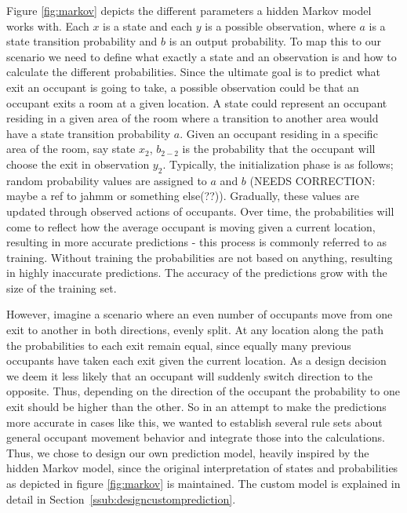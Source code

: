 Figure \ref{fig:markov} depicts the different parameters a hidden Markov model works with. Each \(x\) is a state and each \(y\) is a possible observation, where \(a\) is a state transition probability and \(b\) is an output probability. To map this to our scenario we need to define what exactly a state and an observation is and how to calculate the different probabilities. Since the ultimate goal is to predict what exit an occupant is going to take, a possible observation could be that an occupant exits a room at a given location. A state could represent an occupant residing in a given area of the room where a transition to another area would have a state transition probability \(a\). Given an occupant residing in a specific area of the room, say state \(x_2\), \(b_{2-2}\) is the probability that the occupant will choose the exit in observation \(y_2\). Typically, the initialization phase is as follows; random probability values are assigned to \(a\) and \(b\) (NEEDS CORRECTION: maybe a ref to jahmm or something else(??)). Gradually, these values are updated through observed actions of occupants. Over time, the probabilities will come to reflect how the average occupant is moving given a current location, resulting in more accurate predictions - this process is commonly referred to as training. Without training the probabilities are not based on anything, resulting in highly inaccurate predictions. The accuracy of the predictions grow with the size of the training set.

However, imagine a scenario where an even number of occupants move from one exit to another in both directions, evenly split. At any location along the path the probabilities to each exit remain equal, since equally many previous occupants have taken each exit given the current location. As a design decision we deem it less likely that an occupant will suddenly switch direction to the opposite. Thus, depending on the direction of the occupant the probability to one exit should be higher than the other. So in an attempt to make the predictions more accurate in cases like this, we wanted to establish several rule sets about general occupant movement behavior and integrate those into the calculations. Thus, we chose to design our own prediction model, heavily inspired by the hidden Markov model, since the original interpretation of states and probabilities as depicted in figure \ref{fig:markov} is maintained. The custom model is explained in detail in Section~\ref{ssub:designcustomprediction}. 